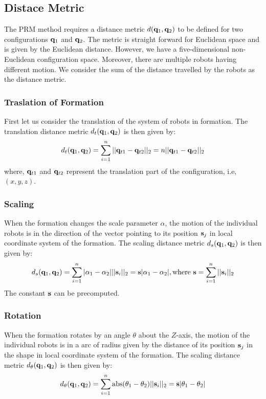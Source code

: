 \documentclass[12pt,a4paper, onecolumn]{IEEEtran}
\begin{document}
\subsection{Distace Metric}
The PRM method requires a distance metric $d(\mathbf{q}_1, \mathbf{q}_2)$ to be defined for two configurations $\mathbf{q}_1$ and $\mathbf{q}_2$. The metric is straight forward for Euclidean space and is given by the Euclidean distance. However, we have a five-dimensional non-Euclidean configuration space. Moreover, there are multiple robots having different motion. We consider the sum of the distance travelled by the robots as the distance metric.
\subsubsection{Traslation of Formation}
First let us consider the translation of the system of robots in formation. The translation distance metric $d_t(\mathbf{q}_1, \mathbf{q}_2)$ is then given by:
\begin{equation}
d_t(\mathbf{q}_1, \mathbf{q}_2) = \sum_{i = 1}^{n} ||\mathbf{q}_{t1} - \mathbf{q}_{t2}||_2 = n||\mathbf{q}_{t1} - \mathbf{q}_{t2}||_2
  \label{eqn:dt}
\end{equation}
where, $\mathbf{q}_{t1}$ and $\mathbf{q}_{t2}$ represent the translation part of the configuration, i.e, $(x, y, z)$.

\subsubsection{Scaling}
When the formation changes the scale parameter $\alpha$, the motion of the individual robots is in the direction of the vector pointing to its position $\mathbf{s}_j$ in local coordinate system of the formation. The scaling distance metric $d_s(\mathbf{q}_1, \mathbf{q}_2)$ is then given by:
\begin{equation}
  d_s(\mathbf{q}_1, \mathbf{q}_2) = \sum_{i=1}^n |\alpha_1 - \alpha_2| ||\mathbf{s}_i||_2 = \mathbf{s} |\alpha_1 - \alpha_2|, \text {where } \mathbf{s} = \sum_{i=1}^n ||\mathbf{s}_i||_2
  \label{eqn:ds}
\end{equation}
The constant $\mathbf{s}$ can be precomputed.

\subsubsection{Rotation}
When the formation rotates by an angle $\theta$ about the $Z$-axis, the motion of the individual robots is in a arc of radius given by the distance of its position $\mathbf{s}_j$  in the shape in local coordinate system of the formation. The scaling distance metric $d_\theta(\mathbf{q}_1, \mathbf{q}_2)$ is then given by:
\begin{equation}
  d_\theta(\mathbf{q}_1, \mathbf{q}_2) = \sum_{i=1}^n \operatorname{abs}(\theta_1 - \theta_2) ||\mathbf{s}_i||_2 = \mathbf{s} |\theta_1 - \theta_2| 
  \label{eqn:dth}
\end{equation}
\end{document}
